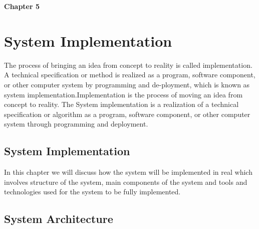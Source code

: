 \documentclass[12pt]{article}
\begin{document}
\newpage

\vspace*{1.5cm} %

\noindent
\LARGE \textbf{Chapter 5}

\vspace{1 cm}

\noindent
\section{System Implementation}

\vspace{0.5cm} %

\noindent
\normalsize The process of bringing an idea from concept to reality is called implementation. A technical specification or method is realized as a program, software component, or other computer system by programming and de-ployment, which is known as system implementation.Implementation is the process of moving an idea from concept to reality. The System implementation is a realization of a technical specification or algorithm as a program, software component, or other computer system through programming and deployment.\cite{anitha2016easy}
\vspace{0.5cm} %

\noindent
\subsection{System Implementation}
\vspace{0.5cm} %

\noindent
\normalsize In this chapter we will discuss how the system will be implemented in real which involves structure of the system, main components of the system and tools and technologies used for the system to be fully implemented. 
\vspace{0.5cm} %

\noindent
\subsection{System Architecture}
\vspace{0.5cm} %
\end{document}
